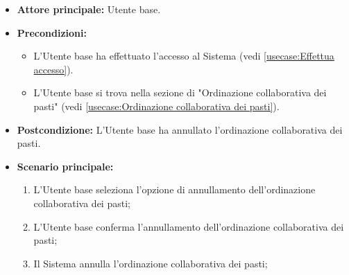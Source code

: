 \label{usecase:Annullamento dell'ordinazione}
\begin{itemize}
	\item \textbf{Attore principale:} Utente base.

	\item \textbf{Precondizioni:}
	\begin{itemize}
		\item L'Utente base ha effettuato l'accesso al Sistema (vedi \autoref{usecase:Effettua accesso}).
		\item L'Utente base si trova nella sezione di "Ordinazione collaborativa dei pasti" (vedi \autoref{usecase:Ordinazione collaborativa dei pasti}).
	\end{itemize}

	\item \textbf{Postcondizione:}
	      L'Utente base ha annullato l'ordinazione collaborativa dei pasti.

	\item \textbf{Scenario principale:}
	      \begin{enumerate}
		      \item L'Utente base seleziona l'opzione di annullamento
		            dell'ordinazione collaborativa dei pasti;

		      \item L'Utente base conferma l'annullamento dell'ordinazione
		            collaborativa dei pasti;

		      \item Il Sistema annulla l'ordinazione collaborativa dei pasti;
	      \end{enumerate}
\end{itemize}
